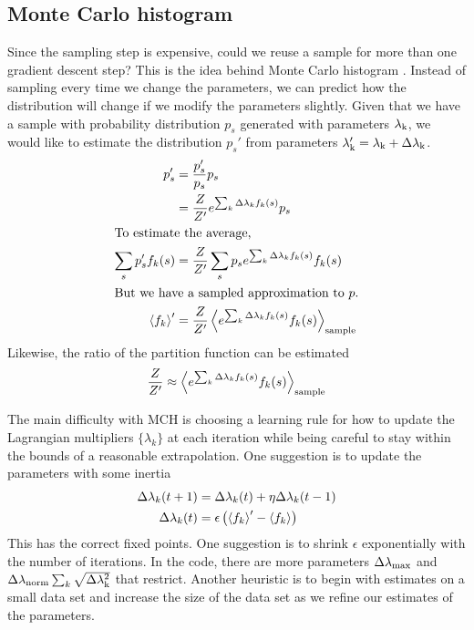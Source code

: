 \documentclass[aps,prl,twocolumn]{revtex4-1}
\begin{document}
\subsection{Monte Carlo histogram}
Since the sampling step is expensive, could we reuse a sample for more than one gradient descent step? This is the idea behind Monte Carlo histogram \cite{Broderick:2007wq}. Instead of sampling every time we change the parameters, we can predict how the distribution will change if we modify the parameters slightly. Given that we have a sample with probability distribution $p_s$ generated with parameters $\lambda_{\rm k}$, we would like to estimate the distribution $p_s'$ from parameters $\lambda_{\rm k}' = \lambda_{\rm k}+\Delta\lambda_{\rm k}$.
\begin{align}
	p_s' &= \frac{p'_s}{p_s}p_s\\
		&= \frac{Z}{Z'}e^{\sum_k \Delta\lambda_k f_k(s)} p_s\\
\intertext{To estimate the average,}
	\sum_s p_s' f_k(s) &= \frac{Z}{Z'} \sum_s p_s e^{\sum_k \Delta\lambda_k f_k(s)} f_k(s)\\
\intertext{But we have a sampled approximation to $p$.}
	\left<f_k\right>' &= \frac{Z}{Z'} \left<e^{\sum_k \Delta\lambda_k f_k(s)} f_k(s)\right>_{\rm sample}
\end{align}
Likewise, the ratio of the partition function can be estimated
\begin{align}
	\frac{Z}{Z'} \approx \left<e^{\sum_k \Delta\lambda_k f_k(s)}f_k(s)\right>_{\rm sample}
\end{align}

The main difficulty with MCH is choosing a learning rule for how to update the Lagrangian multipliers $\{\lambda_k\}$ at each iteration while being careful to stay within the bounds of a reasonable extrapolation. One suggestion is to update the parameters with some inertia
\begin{align}
	\Delta\lambda_k(t+1) &= \Delta \lambda_k(t) + \eta \Delta\lambda_k(t-1)\\
	\Delta \lambda_k(t) &= \epsilon\left(\left<f_k\right>'-\left<f_k\right>\right)
\end{align}
This has the correct fixed points. One suggestion is to shrink $\epsilon$ exponentially with the number of iterations. In the code, there are more parameters $\Delta\lambda_{\rm max}$ and $\Delta\lambda_{\rm norm}\sum_k \sqrt{\Delta\lambda_{\rm k}^2}$ that restrict. Another heuristic is to begin with estimates on a small data set and increase the size of the data set as we refine our estimates of the parameters.
\end{document}
